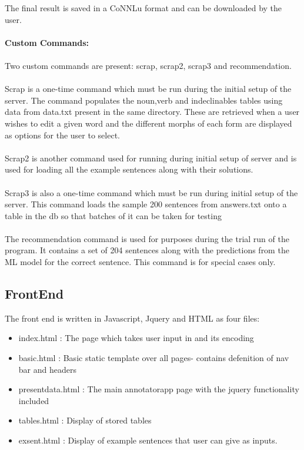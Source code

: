 \documentclass[12pt]{article}
\begin{document}
The final result is saved in a CoNNLu format and can be downloaded by the user.\\
\\ \textbf{Custom Commands:}\\
\\ Two custom commands are present: scrap, scrap2, scrap3 and recommendation. \\ \\Scrap is a one-time command which must be run during the initial setup of the server. The command populates the noun,verb and indeclinables tables using data from data.txt present in the same directory. These are retrieved when a user wishes to edit a given word and the different morphs of each form are displayed as options for the user to select.\\ \\ Scrap2 is another command used for running during initial setup of server and is used for loading all the example sentences along with their solutions.\\ \\ Scrap3 is also a one-time command which must be run during initial setup of the server. This command loads the sample 200 sentences from answers.txt onto a table in the db so that batches of it can be taken for testing\\ \\The recommendation command is used for purposes during the trial run of the program. It contains a set of 204 sentences along with the predictions from the ML model for the correct sentence. This command is for special cases only.

\subsection{FrontEnd}
The front end is written in Javascript, Jquery and HTML as four files:
\begin{itemize}
	\item index.html : The page which takes user input in and its encoding
	\item basic.html : Basic static template over all pages- contains defenition of nav bar and headers
	\item presentdata.html : The main annotatorapp page with the jquery functionality included
	\item tables.html : Display of stored tables
	\item exsent.html : Display of example sentences that user can give as inputs.

\end{itemize}
\end{document}
